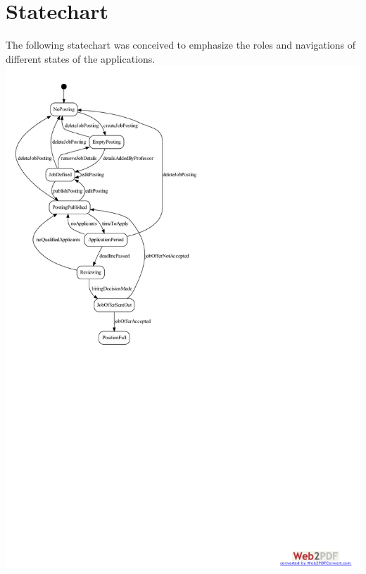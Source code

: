 \documentclass[12pt]{report}
\begin{document}
\chapter{Statechart}
The following statechart was conceived to emphasize the roles and navigations of different states of
the applications.
\includegraphics{model/Diagrams/StateDiagram/StateChartDiagram.pdf}
\end{document}
